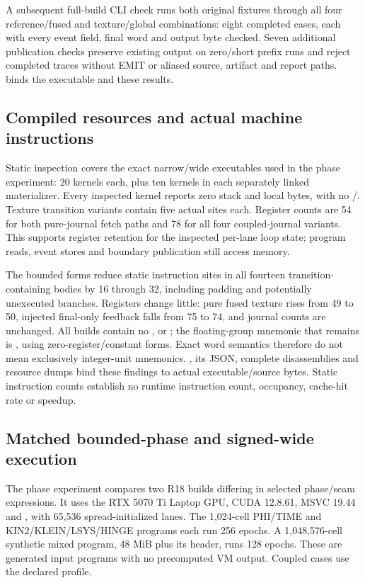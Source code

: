 A subsequent full-build CLI check runs both original fixtures through all
four reference/fused and texture/global combinations: eight completed
cases, each with every event field, final word and output byte checked.
Seven additional publication checks preserve existing output on zero/short
prefix runs and reject completed traces without EMIT or aliased source,
artifact and report paths. 
binds the executable and these results.

\subsection{Compiled resources and actual machine instructions}
Static  inspection covers the exact narrow/wide executables
used in the phase experiment: 20 kernels each, plus ten kernels in each
separately linked materializer. Every inspected kernel reports zero stack
and local bytes, with no /. Texture transition variants
contain five actual  sites each. Register counts are 54 for both
pure-journal fetch paths and 78 for all four coupled-journal variants.
This supports register retention for the inspected per-lane loop state;
program reads, event stores and boundary publication still access memory.

The bounded forms reduce static instruction sites in all fourteen
transition-containing bodies by 16 through 32, including padding and
potentially unexecuted branches. Registers change little: pure fused
texture rises from 49 to 50, injected final-only feedback falls from 75
to 74, and journal counts are unchanged. All builds contain no
,  or ; the floating-group mnemonic that
remains is , using zero-register/constant forms. Exact word
semantics therefore do not mean exclusively integer-unit mnemonics.
, its JSON, complete disassemblies and
resource dumps bind these findings to actual executable/source bytes.
Static instruction counts establish no runtime instruction count,
occupancy, cache-hit rate or speedup.

\subsection{Matched bounded-phase and signed-wide execution}
The phase experiment compares two R18 builds differing in selected
phase/seam expressions. It uses the RTX 5070 Ti Laptop GPU, CUDA 12.8.61,
MSVC 19.44 and , with 65,536 spread-initialized lanes.
The 1,024-cell PHI/TIME and KIN2/KLEIN/LSYS/HINGE programs each run 256
epochs. A 1,048,576-cell synthetic mixed program, 48 MiB plus its header,
runs 128 epochs. These are generated input programs with no precomputed
VM output. Coupled cases use the declared  profile.

